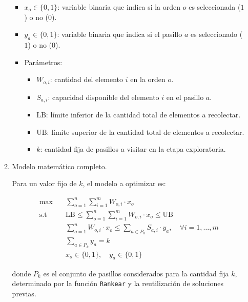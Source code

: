 \documentclass[a4paper,12pt]{article}
\begin{document}
\begin{enumerate}[label=(\alph*), leftmargin=2em]
\begin{enumerate}[label=\roman*., leftmargin=0.2em]
            \begin{itemize}
                \item \(x_o \in \{0,1\}\): variable binaria que indica si la orden \(o\) es seleccionada (\(1\)) o no (\(0\)).
                \item \(y_a \in \{0,1\}\): variable binaria que indica si el pasillo \(a\) es seleccionado (\(1\)) o no (\(0\)).
                \item Parámetros:
                \begin{itemize}
                    \item \(W_{o,i}\): cantidad del elemento \(i\) en la orden \(o\).
                    \item \(S_{a,i}\): capacidad disponible del elemento \(i\) en el pasillo \(a\).
                    \item \(\mathrm{LB}\): límite inferior de la cantidad total de elementos a recolectar.
                    \item \(\mathrm{UB}\): límite superior de la cantidad total de elementos a recolectar.
                    \item \(k\): cantidad fija de pasillos a visitar en la etapa exploratoria.
                \end{itemize}
            \end{itemize}

        \item Modelo matemático completo.

            Para un valor fijo de \(k\), el modelo a optimizar es:

            \[
            \begin{aligned}
            \max \quad & \sum_{o=1}^{n} \sum_{i=1}^{m} W_{o,i} \cdot x_o \\
            \text{s.t} \quad
            & \mathrm{LB} \leq \sum_{o=1}^n \sum_{i=1}^m W_{o,i} \cdot x_o \leq \mathrm{UB} \\
            & \sum_{o=1}^n W_{o,i} \cdot x_o \leq \sum_{a \in P_k} S_{a,i} \cdot y_a, \quad \forall i = 1,\ldots,m \\
            & \sum_{a \in P_k} y_a = k \\
            & x_o \in \{0,1\}, \quad y_a \in \{0,1\}
            \end{aligned}
            \]

            donde \(P_k\) es el conjunto de pasillos considerados para la cantidad fija \(k\), determinado por la función \texttt{Rankear} y la reutilización de soluciones previas.


\end{enumerate}
\end{enumerate}
\end{document}

